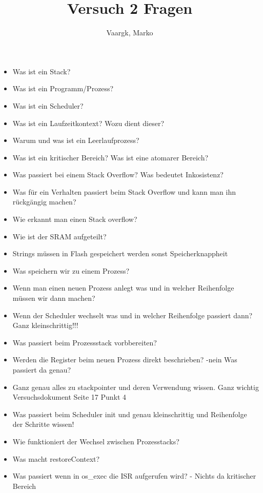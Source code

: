 \documentclass[12pt]{article}
\title{Versuch 2 Fragen}
\author{
        Vaargk, Marko

}
\begin{document}
\maketitle

\begin{itemize}
\item Was ist ein Stack?
\item Was ist ein Programm/Prozess?
\item Was ist ein Scheduler?
\item Was ist ein Laufzeitkontext? Wozu dient dieser?
\item Warum und was ist ein Leerlaufprozess?
\item Was ist ein kritischer Bereich? Was ist eine atomarer Bereich?
\item Was passiert bei einem Stack Overflow? Was bedeutet Inkosistenz?
\item Was für ein Verhalten passiert beim Stack Overflow und kann man ihn rückgängig machen?
\item Wie erkannt man einen Stack overflow?
\item Wie ist der SRAM aufgeteilt?
\item Strings müssen in Flash gespeichert werden sonst Speicherknappheit
\item Was speichern wir zu einem Prozess?
\item Wenn man einen neuen Prozess anlegt was und in welcher Reihenfolge müssen wir dann machen?
\item Wenn der Scheduler wechselt was und in welcher Reihenfolge passiert dann? Ganz kleinschrittig!!!
\item Was passiert beim Prozessstack vorbbereiten?
\item Werden die Register beim neuen Prozess direkt beschrieben? -nein Was passiert da genau?
\item Ganz genau alles zu stackpointer und deren Verwendung wissen. Ganz wichtig Versuchsdokument Seite 17 Punkt 4
\item Was passiert beim Scheduler init und genau kleinschrittig und Reihenfolge der Schritte wissen!
\item Wie funktioniert der Wechsel zwischen Prozesstacks?
\item Was macht restoreContext?
\item Was passiert wenn in os_exec die ISR aufgerufen wird? - Nichts da kritischer Bereich
\end{itemize}
\end{document}
